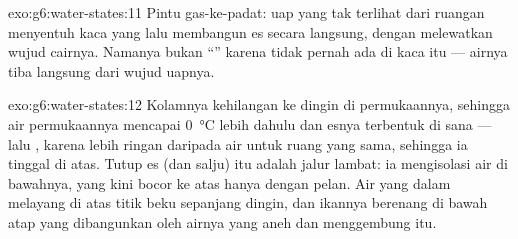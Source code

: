 \begin{solution}{exo:g6:water-states:11}
Pintu gas-ke-padat: uap yang tak terlihat dari  ruangan menyentuh
kaca yang  lalu membangun es secara langsung, dengan
melewatkan wujud cairnya. Namanya bukan ``'' karena tidak
pernah ada  di kaca itu --- airnya tiba langsung dari wujud
uapnya.
\end{solution}

\begin{solution}{exo:g6:water-states:12}
Kolamnya kehilangan  ke   dingin di permukaannya,
sehingga air permukaannya mencapai \qty{0}{\celsius} lebih dahulu dan
esnya terbentuk di sana --- lalu , karena lebih ringan
daripada air untuk ruang yang sama, sehingga ia tinggal di atas.
Tutup es (dan salju) itu adalah jalur lambat: ia mengisolasi air di
bawahnya, yang  kini bocor ke atas hanya dengan pelan. Air
yang dalam melayang di atas titik beku sepanjang  dingin, dan
ikannya berenang di bawah atap yang dibangunkan oleh airnya yang aneh
dan menggembung itu.
\end{solution}


